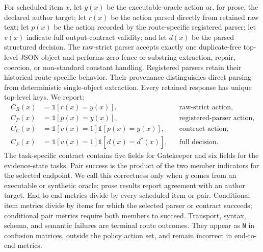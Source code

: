 \documentclass[10pt]{article}
\begin{document}
For scheduled item $x$, let $y(x)$ be the executable-oracle action or, for prose, the declared
author target; let $r(x)$ be the action parsed directly from retained raw text; let $p(x)$ be the
action recorded by the route-specific registered parser; let $v(x)$
indicate full output-contract validity; and let $d(x)$ be the parsed structured decision. The
raw-strict parser accepts exactly one duplicate-free top-level JSON object and performs zero fence or
substring extraction, repair, coercion, or non-standard constant handling. Registered parsers retain
their historical route-specific behavior. Their provenance distinguishes direct parsing from
deterministic single-object extraction. Every retained response has unique top-level keys. We report:
\begin{align*}
C_R(x)&=\mathbb 1[r(x)=y(x)], &&\text{raw-strict action},\\
C_P(x)&=\mathbb 1[p(x)=y(x)], &&\text{registered-parser action},\\
C_C(x)&=\mathbb 1[v(x)=1]\mathbb 1[p(x)=y(x)], &&\text{contract action},\\
C_F(x)&=\mathbb 1[v(x)=1]\mathbb 1[d(x)=d^*(x)], &&\text{full decision}.
\end{align*}
The task-specific contract contains five fields for Gatekeeper and six fields for the evidence-state
tasks. Pair success is the product of the two member indicators for the selected endpoint. We call
this correctness only when $y$ comes from an executable or synthetic oracle; prose results report
agreement with an author target.
End-to-end metrics divide by every scheduled item or pair. Conditional item metrics divide by items
for which the selected parser or contract succeeds; conditional pair metrics require both members to
succeed. Transport, syntax, schema, and semantic failures are terminal route outcomes. They appear
as \texttt{N} in confusion matrices, outside the policy action set, and remain incorrect in
end-to-end metrics.
\end{document}
